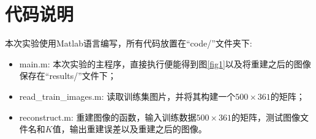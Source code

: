 \documentclass[cn]{elegantbook}
\begin{document}
\chapter{代码说明}
本次实验使用Matlab语言编写，所有代码放置在“code/”文件夹下:
\begin{itemize}
	\item main.m: 本次实验的主程序，直接执行便能得到图\ref{fig1}以及将重建之后的图像保存在“results/”文件下；
	\item read\_train\_images.m: 读取训练集图片，并将其构建一个$500\times 361$的矩阵；
	\item reconstruct.m: 重建图像的函数，输入训练数据$500\times 361$的矩阵，测试图像文件名和$K$值，输出重建误差以及重建之后的图像。
\end{itemize}
\end{document}
